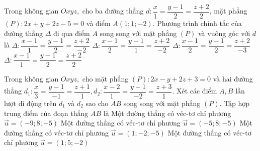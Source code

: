 \begin{ex}%
	Trong không gian $Oxyz,$ cho ba đường thẳng $d\colon \dfrac{x}{1}=\dfrac{y-1}{2}=\dfrac{z+2}{2}$, mặt phẳng $(P)\colon 2x+y+2z-5=0$ và điểm $A(1;1;-2)$. Phương trình chính tắc của đường thẳng $\Delta$ đi qua điểm $A$ song song với mặt phẳng $(P)$ và vuông góc với $d$ là
	\choice
	{$\Delta\colon\dfrac{x-1}{1}=\dfrac{y-1}{2}=\dfrac{z+2}{-2}$}
	{$\Delta\colon\dfrac{x-1}{2}=\dfrac{y-1}{1}=\dfrac{z+2}{-2}$}
	{\True $\Delta\colon\dfrac{x-1}{2}=\dfrac{y-1}{2}=\dfrac{z+2}{-3}$}
	{$\Delta\colon\dfrac{x-1}{1}=\dfrac{y-1}{2}=\dfrac{z+2}{2}$}
\end{ex}
\begin{ex}%
	Trong không gian $Oxyz,$ cho mặt phẳng $(P)\colon 2x-y+2z+3=0$ và hai đường thẳng $d_1\colon \dfrac{x}{3}=\dfrac{y-1}{-1}=\dfrac{z+1}{1}, d_2\colon \dfrac{x-2}{1}=\dfrac{y-1}{-2}=\dfrac{z+3}{1}$. Xét các điểm $A, B$ lần lượt di động trên $d_1$ và $d_2$ sao cho $AB$ song song với mặt phẳng $(P)$. Tập hợp trung điểm của đoạn thẳng $AB$ là
	\choice
	{\True Một đường thẳng có véc-tơ chỉ phương $\overrightarrow{u}=(-9;8;-5)$ }
	{Một đường thẳng có véc-tơ chỉ phương $\overrightarrow{u}=(-5;8;-5)$ }
	{Một đường thẳng có véc-tơ chỉ phương $\overrightarrow{u}=(1;-2;-5)$ }
	{Một đường thẳng có véc-tơ chỉ phương $\overrightarrow{u}=(1;5;-2)$ }
\end{ex}

